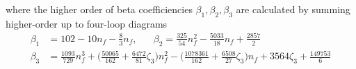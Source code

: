 \noindent where the higher order of beta coefficiencies  $\beta_1,\beta_2,\beta_3$ are calculated by summing higher-order up to four-loop diagrams
\begin{equation*}
\begin{split}
\beta_1 &= 102 - 10 n_f - \frac{8}{3} n_f  , \;\;\;\;\;\;
\beta_2 = \frac{325}{54}n_f^2 - \frac{5033}{18}n_f   +\frac{2857}{2} \\
\beta_3  &= \frac{1093}{729}n_f^3  + \big ( \frac{50065}{162}+\frac{6472}{81}\zeta_3 \big ) n_f^2   -  \big ( \frac{1078361}{162}+\frac{6508}{27}\zeta_3 \big ) n_f + 3564\zeta_3+\frac{149753}{6}
\end{split}
\end{equation*}

